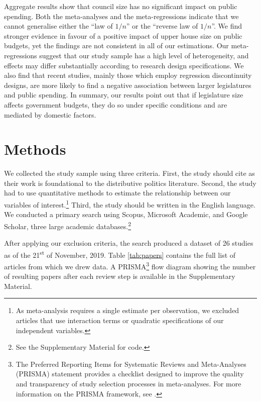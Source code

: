 \documentclass[a4paper,12pt]{article}
\begin{document}
Aggregate results show that council size has no significant impact on public
spending. Both the meta-analyses and the meta-regressions indicate that we
cannot generalise either the ``law of $1/n$'' or the ``reverse law of $1/n$''.
We find stronger evidence in favour of a positive impact of upper house size on
public budgets, yet the findings are not consistent in all of our estimations.
Our meta-regressions suggest that our study sample has a high level of
heterogeneity, and effects may differ substantially according to research design
specifications. We also find that recent studies, mainly those which employ
regression discontinuity designs, are more likely to find a negative association
between larger legislatures and public spending. In summary, our results point
out that if legislature size affects government budgets, they do so under
specific conditions and are mediated by domestic factors.

\section{Methods}

We collected the study sample using three criteria. First, the study should cite
\citet{weingast1981political} as their work is foundational to the distributive
politics literature. Second, the study had to use quantitative methods to
estimate the relationship between our variables of interest.\footnote{As
meta-analysis requires a single estimate per observation, we excluded articles
that use interaction terms or quadratic specifications of our independent
variables.} Third, the study should be written in the English language. We
conducted a primary search using Scopus, Microsoft Academic, and Google Scholar,
three large academic databases.\footnote{See the Supplementary Material for code.}

After applying our exclusion criteria, the search produced a dataset of 26
studies as of the 21\textsuperscript{st} of November, 2019. Table
\ref{tab:papers} contains the full list of articles from which we drew data. A
PRISMA\footnote{The Preferred Reporting Items for Systematic Reviews and
  Meta-Analyses (PRISMA) statement provides a checklist designed to improve the
quality and transparency of study selection processes in meta-analyses. For more
information on the PRISMA framework, see \citet{liberati2009prisma}.} flow
diagram showing the number of resulting papers after each review step is
available in the Supplementary Material.
\end{document}
